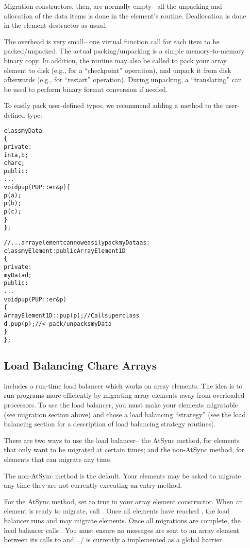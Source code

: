 Migration constructors, then, are normally empty-- all the unpacking
and allocation of the data items is done in the element's  routine.
Deallocation is done in the element destructor as usual.

The  overhead is very small-- one virtual function call
for each item to be packed/unpacked.  The actual packing/unpacking is
a simple memory-to-memory binary copy.  In addition, the 
routine may also be called to pack your array element to disk (e.g.,
for a ``checkpoint'' operation), and unpack it from disk afterwards
(e.g., for ``restart'' operation).  During unpacking, a
``translating''  can be used to perform binary format
conversion if needed.

To easily pack user-defined types, we recommend adding
a  method to the user-defined type:

\begin{alltt}
class myData 
\{
private:
    int a,b;
    char c;
public:
    ...
    void pup(PUP::er \&p) \{
        p(a);
        p(b);
        p(c);
    \}
\};

//... array element can now easily pack myData as:
class myElement:public ArrayElement1D 
\{
private:
    myData d;
public:
    ...
    void pup(PUP::er \&p)
    \{
        ArrayElement1D::pup(p); //Call superclass
        d.pup(p); //<- pack/unpacks myData
    \}
\};
\end{alltt}


\subsection{Load Balancing Chare Arrays}
\charmpp{} includes a run-time load balancer which works
on array elements.  The idea is to run programs more efficiently
by migrating array elements away from overloaded processors.
To use the load balancer, you must make your elements migratable
(see migration section above) and chose a load balancing 
``strategy'' (see the load balancing section for a description
of load balancing strategy routines).

There are two ways to use the load balancer-- the AtSync
method, for elements that only want to be migrated at certain
times; and the non-AtSync method, for elements that can migrate
any time.

The non-AtSync method is the default.  Your elements may be
asked to migrate any time they are not currently executing
an entry method.

For the AtSync method, set  to true in your 
array element constructor.  When an element is ready to migrate,
call .  Once all elements have reached , 
the load balancer runs and may migrate elements.  Once
all migrations are complete, the load balancer calls 
.  You must ensure no messages are
sent to an array element between its calls to  and
. / is currently
a implemented as a global barrier.

